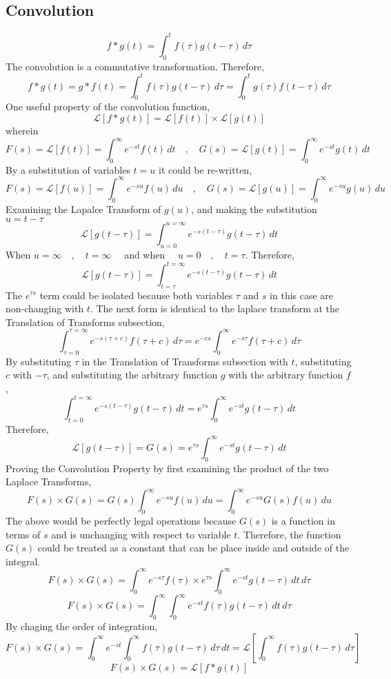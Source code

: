 \documentclass[a4paper, 12pt]{report}
\def\l{\left}
\def\r{\right}
\def\dst{\displaystyle}
\def\lap{\mathcal{L}}
\begin{document}
\begin{center}
\subsection{Convolution}
$$f*g(t) = \int^{t}_{0}f(\tau)g(t - \tau)\,d\tau$$
The convolution is a commutative transformation. Therefore,
$$f*g(t) = g*f(t) = \int^{t}_{0}f(\tau)g(t - \tau)\,d\tau = \int^{t}_{0}g(\tau)f(t - \tau)\,d\tau$$
One useful property of the convolution function,
$$\lap\l[f*g(t)\r] = \lap\l[f(t)\r]\times\lap\l[g(t)\r]$$
wherein
$$F(s) = \lap[f(t)] = \int^{\infty}_{0}e^{-st}f(t)\,dt\quad,\quad G(s) = \lap[g(t)] = \int^{\infty}_{0}e^{-st}g(t)\,dt$$
By a substitution of variables $t = u$ it could be re-written,
$$F(s) = \lap[f(u)] = \int^{\infty}_{0}e^{-su}f(u)\,du\quad,\quad G(s) = \lap[g(u)] = \int^{\infty}_{0}e^{-su}g(u)\,du$$
Examining the Lapalce Transform of $g(u)$, and making the substitution $u = t-\tau$
$$\lap[g(t-\tau)] = \int^{u = \infty}_{u = 0}e^{-s(t-\tau)}g(t-\tau)\,dt$$
When $\dst{u = \infty\quad,\quad t=\infty}\quad$ and when $\quad\dst{u = 0 \quad,\quad t = \tau}$. Therefore,
$$\lap[g(t-\tau)] = \int^{t = \infty}_{t = \tau}e^{-s(t-\tau)}g(t-\tau)\,dt$$
The $\dst{e^{\tau s}}$ term could be isolated because both variables $\tau$ and $s$ in this case are non-changing with $t$. The next form is identical to the laplace transform at the Translation of Transforms subsection,
$$\int^{\tau = \infty}_{\tau = 0}e^{-s(\tau + c)}f(\tau + c)\,d\tau = e^{-cs}\int^{\infty}_{0}e^{-s\tau}f(\tau + c)\,d\tau$$
By substituting $\tau$ in the Translation of Transforms subsection with $t$, substituting $c$ with $-\tau$, and substituting the arbitrary function $g$ with the arbitrary function $f$,
$$\int^{t = \infty}_{t = 0}e^{-s(t -\tau)}g(t -\tau)\,dt = e^{\tau s}\int^{\infty}_{0}e^{-st}g(t - \tau)\,dt$$
Therefore,
$$\lap[g(t-\tau)] = G(s) = e^{\tau s}\int^{\infty}_{0}e^{-st}g(t - \tau)\,dt$$
Proving the Convolution Property by first examining the product of the two Laplace Transforms,
$$F(s)\times G(s) = G(s)\int^{\infty}_{0}e^{-su}f(u)\,du = \int^{\infty}_{0}e^{-su}G(s)f(u)\,du$$
The above would be perfectly legal operations because $G(s)$ is a function in terms of $s$ and is unchanging with respect to variable $t$. Therefore, the function $G(s)$ could be treated as a constant that can be place inside and outside of the integral.
$$F(s)\times G(s) = \int^{\infty}_{0}e^{-s\tau}f(\tau) \times e^{\tau s}\int^{\infty}_{0}e^{-st}g(t - \tau)\,dt\,d\tau$$
$$F(s)\times G(s) = \int^{\infty}_{0}\int^{\infty}_{0}e^{-st}f(\tau)g(t - \tau)\,dt\,d\tau$$
By chaging the order of integration,
$$F(s)\times G(s) = \int^{\infty}_{0}e^{-st}\int^{\infty}_{0}f(\tau)g(t - \tau)\,d\tau\,dt = \lap\l[\int^{\infty}_{0}f(\tau)g(t - \tau)\,d\tau\r]$$
$$F(s)\times G(s) = \lap\l[f*g(t)\r]$$

\end{center}
\end{document}
